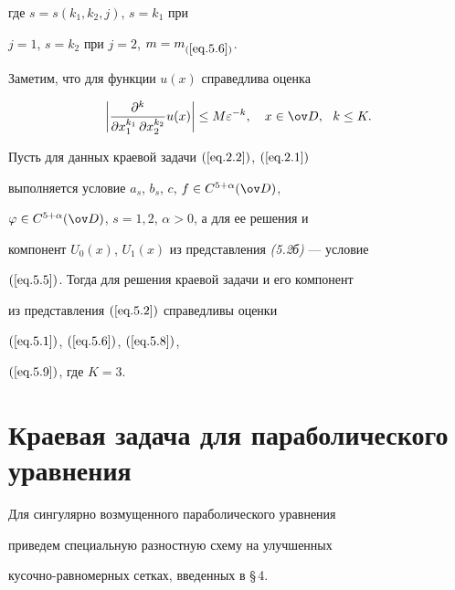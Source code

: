 где $s=s(k_1,k_2,j)$, $s=k_1$ при


$j=1$, $s=k_2$ при $j=2$, $m=m_{(\ref{eq.5.6})}$.





Заметим, что для функции $u(x)$ справедлива оценка


\begin{equation} \label{eq.5.9}


\bigg|\frac{\partial^{k}}{\partial x_1^{k_1}\,


\partial x_2^{k_2}}u(x)\bigg|\le


M \varepsilon^{-k},\quad x\in \ov D, \ \ k\le K.


\end{equation}





\begin{thms}\label{t5.1}


Пусть для данных краевой задачи $(\ref{eq.2.2})$, $(\ref{eq.2.1})$


выполняется условие $a_s$, $b_s$, $c$, $f\in C^{5+\alpha}(\ov D)$,


$\varphi\in C^{5+\alpha}(\ov D)$, $s=1,2$, $\alpha>0$, а для ее решения и


компонент $U_0(x)$, $U_1(x)$ из представления {\em (5.2б)} --- условие


$(\ref{eq.5.5})$. Тогда для решения краевой задачи и его компонент


из представления $(\ref{eq.5.2})$ справедливы оценки


$(\ref{eq.5.1})$, $(\ref{eq.5.6})$, $(\ref{eq.5.8})$,


$(\ref{eq.5.9})$, где $K=3$.


\end{thms}





\section{Краевая задача для параболического уравнения} \label{section.6}





Для сингулярно возмущенного параболического уравнения


приведем специальную разностную схему на улучшенных


кусочно-равномерных сетках, введенных в \S\,4.






